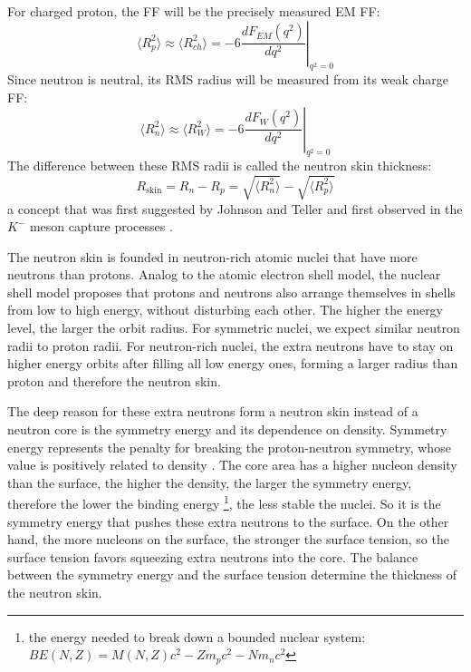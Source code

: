 For charged proton, the FF will be the precisely measured EM FF:
\begin{equation}
    \langle R_p^2 \rangle \approx \langle R_{ch}^2 \rangle= -6 \left. \frac{dF_{EM}(q^2)}{dq^2} \right|_{q^2 = 0}
\end{equation}
Since neutron is neutral, its RMS radius will be measured from its weak charge FF:
\begin{equation}
    \langle R_n^2 \rangle \approx \langle R_W^2 \rangle = -6 \left. \frac{dF_{W}(q^2)}{dq^2} \right|_{q^2 = 0}
\end{equation}
The difference between these RMS radii is called the neutron skin thickness:
\begin{equation}
    R_{\text{skin}} = R_n - R_p = \sqrt{\langle R_n^2 \rangle} - \sqrt{\langle R_p^2 \rangle}
\end{equation}
a concept that was first suggested by Johnson and Teller \cite{PhysRev.93.357}
and first observed in the $K^-$ meson capture processes \cite{BURHOP1969625}.

The neutron skin is founded in neutron-rich atomic nuclei that have more 
neutrons than protons. Analog to the atomic electron shell model, the nuclear
shell model proposes that protons and neutrons also arrange themselves in
shells from low to high energy, without disturbing each other.
The higher the energy level, the larger the orbit radius.
For symmetric nuclei, we expect similar neutron radii to proton radii. 
For neutron-rich nuclei, the extra neutrons
have to stay on higher energy orbits after filling all low energy ones, forming
a larger radius than proton and therefore the neutron skin.

The deep reason for these extra neutrons form a neutron skin instead of
a neutron core is the symmetry energy and its dependence on density. 
Symmetry energy represents the penalty for breaking the proton-neutron symmetry,
whose value is positively related to density \cite{10.3389/fphy.2019.00213}.
The core area has a higher nucleon density than the surface, the higher the density, 
the larger the symmetry energy, therefore the lower the binding energy 
\footnote{the energy needed to break down a bounded nuclear system: $BE(N, Z) = M(N, Z)c^2 - Zm_p c^2 - Nm_n c^2$}, 
the less stable the nuclei. So it is the symmetry energy that pushes these extra neutrons to 
the surface. On the other hand, the more nucleons on the surface, the stronger 
the surface tension, so the surface tension favors squeezing extra neutrons %
into the core. The balance between the symmetry energy and 
the surface tension determine the thickness of the neutron skin.

